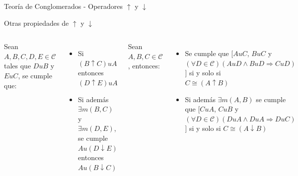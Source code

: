 \documentclass{beamer}
\begin{document}
\begin{frame}{Teoría de Conglomerados - Operadores $\uparrow$ y $\downarrow$}

\begin{center}
    Otras propiedades de $\uparrow$ y $\downarrow$
\end{center}

\begin{columns}
Sean $A,B,C,D,E \in \mathcal{C}$ tales que $DuB$ y $EuC$, se cumple que:
	\begin{itemize}
		\item[a)] Si $(B \uparrow C) u A$ entonces $(D \uparrow E) uA$
		\item[b)] Si además $\exists m(B,C)$ y $\exists m(D,E)$, se cumple $Au(D \downarrow E)$ entonces $A u (B \downarrow C)$
	\end{itemize}


	Sean $A,B,C \in \mathcal{C}$, entonces:
	\begin{itemize}
	    	\item[a)] Se cumple que [$AuC$, $BuC$ y $(\forall D \in \mathcal{C})(AuD \wedge BuD \Rightarrow CuD)$] si y solo si\\
	$C \cong (A \uparrow B)$
	    \item[b)] Si además $\exists m(A,B)$ se cumple que [$CuA$, $CuB$ y $(\forall D \in \mathcal{C})(DuA \wedge DuA \Rightarrow DuC)$] si y solo si $C \cong (A \downarrow B)$

	\end{itemize}

\end{columns}

\end{frame}
\end{document}
